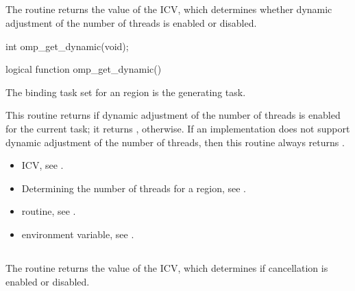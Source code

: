 \subsection{}
\label{subsec:omp_get_dynamic}
\summary
The  routine returns the value of the  ICV, which 
determines whether dynamic adjustment of the number of threads is enabled or disabled.

\format
\ccppspecificstart
\begin{boxedcode}
int omp\_get\_dynamic(void);
\end{boxedcode}
\ccppspecificend

\fortranspecificstart
\begin{boxedcode}
logical function omp\_get\_dynamic()
\end{boxedcode}
\fortranspecificend

\binding
The binding task set for an  region is the generating task. 

\effect
This routine returns  if dynamic adjustment of the number of threads is enabled for 
the current task; it returns , otherwise. If an implementation does not support 
dynamic adjustment of the number of threads, then this routine always returns .

\crossreferences
\begin{itemize}
\item {} ICV, see 
.

\item Determining the number of threads for a  region, see
. 

\item {} routine, see 
.

\item {} environment variable, see 
.
\end{itemize}









\subsection{}
\label{subsec:omp_get_cancellation}
\summary
The  routine returns the value of the  ICV, which determines if cancellation is enabled or disabled.

